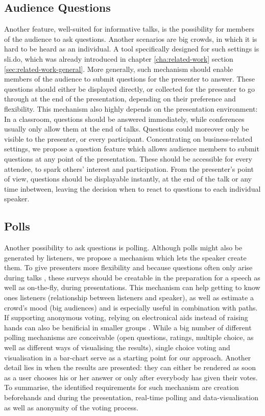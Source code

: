 \subsection{Audience Questions}
Another feature, well-suited for informative talks, is the possibility for members of the audience to ask questions. Another scenarios are big crowds, in which it is hard to be heard as an individual. A tool specifically designed for such settings is sli.do, which was already introduced in chapter \ref{cha:related-work} section \ref{sec:related-work-general}.
More generally, such mechanism should enable members of the audience to submit questions for the presenter to answer. These questions should either be displayed directly, or collected for the presenter to go through at the end of the presentation, depending on their preference and flexibility. This mechanism also highly depends on the presentation environment: In a classroom, questions should be answered immediately, while conferences usually only allow them at the end of talks. Questions could moreover only be visible to the presenter, or every participant. Concentrating on business-related settings, we propose a question feature which allows audience members to submit questions at any point of the presentation. These should be accessible for every attendee, to spark others' interest and participation. From the presenter's point of view, questions should be displayable instantly, at the end of the talk or any time inbetween, leaving the decision when to react to questions to each individual speaker.


\subsection{Polls}
Another possibility to ask questions is polling. Although polls might also be generated by listeners, we propose a mechanism which lets the speaker create them. To give presenters more flexibility and because questions often only arise during talks \cite{Esponda:ElectronicVotingOnTheFly}, these surveys should be creatable in the preparation for a speech as well as on-the-fly, during presentations. This mechanism can help getting to know ones listeners (relationship between listeners and speaker), as well as estimate a crowd's mood (big audiences) and is especially useful in combination with paths. If supporting anonymous voting, relying on electronical aids instead of raising hands can also be benificial in smaller groups \cite{Esponda:ElectronicVotingOnTheFly}.
While a big number of different polling mechanisms are conceivable (open questions, ratings, multiple choice, as well as different ways of visualising the results), single choice voting and visualisation in a bar-chart serve as a starting point for our approach. Another detail lies in when the results are presented: they can either be rendered as soon as a user chooses his or her answer or only after everybody has given their votes.
To summarise, the identified requirements for such mechanism are creation beforehands and during the presentation, real-time polling and data-visualisation as well as anonymity of the voting process.


